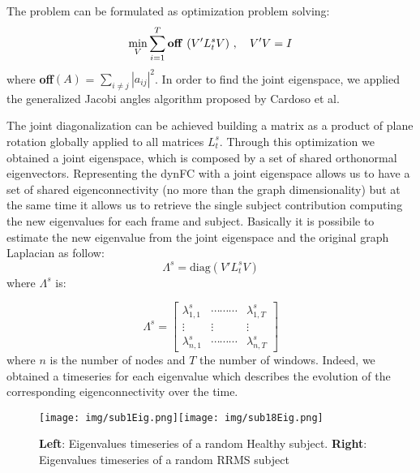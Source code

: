 \documentclass[review]{elsarticle}
\begin{document}
The problem can be formulated as optimization problem solving: 
\begin{equation}
\min_{V} \sum_{{i=1}}^T  \mbox{\textbf{off}} \ {(V'L^s_{t} V)} \ ,  \quad V'V = I
\label{eqn:Jade}
\end{equation}
where \textbf{off}$(A)$ = $\sum_{i \ne j } | a_{ij}|^2$. In order to find the joint eigenspace, we applied the generalized Jacobi angles algorithm proposed by Cardoso et al. %

The joint diagonalization can be achieved building a matrix %
as a product of plane rotation globally applied to all matrices $L^s_{t}$. Through this optimization we obtained a joint eigenspace, which is composed by a set of shared orthonormal eigenvectors. 
Representing the dynFC with a joint eigenspace allows us to have a set of shared eigenconnectivity (no more than the graph dimensionality) but at the same time it allows us to retrieve the single subject contribution computing the new eigenvalues for each frame and subject. 
Basically it is possibile to estimate the new eigenvalue from the joint eigenspace and the original graph Laplacian as follow:
\begin{equation}
\Lambda^s = \mbox{diag}(V'L^s_{t}V)  
\label{eqn:Ltilde}
\end{equation}
where $\Lambda^s$ is:

\begin{equation}
\Lambda^s = 
\begin{bmatrix} 
\lambda^s_{1,1} & \cdots  \cdots \cdots & \lambda^s_{1,T} \\ \vdots & \vdots & \vdots \\ \lambda^s_{n,1} & \cdots \cdots \cdots & \lambda^s_{n,T}  
\end{bmatrix}
\end{equation}
where $n$ is the number of nodes and $T$ the number of windows. Indeed, we obtained a timeseries for each eigenvalue which describes the evolution of the corresponding eigenconnectivity over the time. 

\begin{figure}[b!]
\texttt{[image: img/sub1Eig.png]}\texttt{[image: img/sub18Eig.png]}
\caption{\textbf{Left}: Eigenvalues timeseries of a random Healthy subject. \textbf{Right}: Eigenvalues timeseries of a random RRMS subject}
\end{figure}
\end{document}
